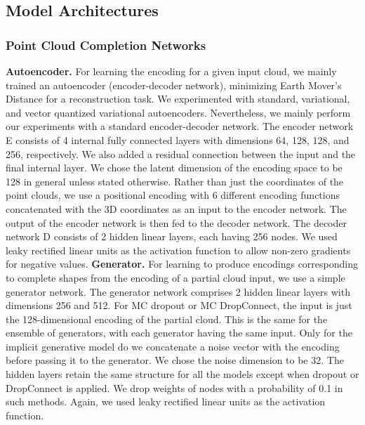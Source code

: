     \subsection{Model Architectures}

        \subsubsection{Point Cloud Completion Networks}
        \textbf{Autoencoder.} 
        For learning the encoding for a given input cloud, we mainly trained an autoencoder (encoder-decoder network), minimizing Earth Mover's Distance for a reconstruction task. We experimented with standard, variational, and vector quantized variational autoencoders. Nevertheless, we mainly perform our experiments with a standard encoder-decoder network. The encoder network E consists of 4 internal fully connected layers with dimensions 64, 128, 128, and 256, respectively. We also added a residual connection between the input and the final internal layer. We chose the latent dimension of the encoding space to be 128 in general unless stated otherwise. Rather than just the coordinates of the point clouds, we use a positional encoding with 6 different encoding functions concatenated with the 3D coordinates as an input to the encoder network. The output of the encoder network is then fed to the decoder network. The decoder network D consists of 2 hidden linear layers, each having 256 nodes. We used leaky rectified linear units as the activation function to allow non-zero gradients for negative values.
        \newline \textbf{Generator.}
        For learning to produce encodings corresponding to complete shapes from the encoding of a partial cloud input, we use a simple generator network. The generator network comprises 2 hidden linear layers with dimensions 256 and 512. For MC dropout or MC DropConnect, the input is just the 128-dimensional encoding of the partial cloud. This is the same for the ensemble of generators, with each generator having the same input. Only for the implicit generative model do we concatenate a noise vector with the encoding before passing it to the generator. We chose the noise dimension to be 32. The hidden layers retain the same structure for all the models except when dropout or DropConnect is applied. We drop weights of nodes with a probability of 0.1 in such methods. Again, we used leaky rectified linear units as the activation function.
        
